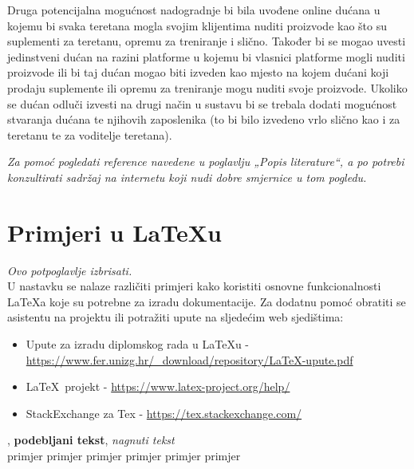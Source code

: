 		Druga potencijalna mogućnost nadogradnje bi bila uvođene online dućana u kojemu 
		bi svaka teretana mogla svojim klijentima nuditi proizvode kao što su suplementi za 
		teretanu, opremu za treniranje i slično. Također bi se mogao uvesti jedinstveni 
		dućan na razini platforme u kojemu bi vlasnici platforme mogli nuditi proizvode ili bi 
		taj dućan mogao biti izveden kao mjesto na kojem dućani koji prodaju suplemente ili 
		opremu za treniranje mogu nuditi svoje proizvode. Ukoliko se dućan odluči izvesti na 
		drugi način u sustavu bi se trebala dodati mogućnost stvaranja dućana te njihovih 
		zaposlenika (to bi bilo izvedeno vrlo slično kao i za teretanu te za voditelje teretana).
		
		
	
		\vspace{5mm}
	
			
		\textit{Za pomoć pogledati reference navedene u poglavlju „Popis literature“, a po potrebi konzultirati sadržaj na internetu koji nudi dobre smjernice u tom pogledu.}
		\eject
		
		\section{Primjeri u \LaTeX u}
		
		\textit{Ovo potpoglavlje izbrisati.}\\

		U nastavku se nalaze različiti primjeri kako koristiti osnovne funkcionalnosti \LaTeX a koje su potrebne za izradu dokumentacije. Za dodatnu pomoć obratiti se asistentu na projektu ili potražiti upute na sljedećim web sjedištima:
		\begin{itemize}
			\item Upute za izradu diplomskog rada u \LaTeX u - \url{https://www.fer.unizg.hr/_download/repository/LaTeX-upute.pdf}
			\item \LaTeX\ projekt - \url{https://www.latex-project.org/help/}
			\item StackExchange za Tex - \url{https://tex.stackexchange.com/}\\
		
		\end{itemize} 	


		
		\noindent {}, \textbf{podebljani tekst}, 	\textit{nagnuti tekst}\\
		\noindent \normalsize primjer \large primjer \Large primjer \LARGE {primjer} \huge {primjer} \Huge primjer \normalsize
				
